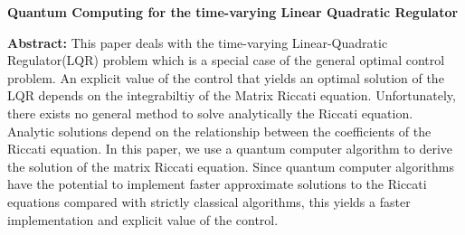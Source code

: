 \documentclass[12pt]{article}
\title{}
\begin{document}
\begin{center}
\textbf{{\huge  Quantum Computing for the time-varying   Linear Quadratic Regulator }}
    \begin{center} 
\bigskip
\bigskip
    {\large } 
\end{center}
\begin{center}
\end{center}
\end{center}
\begin{center} 
\end{center}
\begin{center} 
\bigskip

\end{center}

    \begin{center}                                                  {\large} 
\end{center}

{\Large \bf Abstract:}
This paper deals with the time-varying Linear-Quadratic Regulator(LQR) problem which is a special case of the general optimal control problem. An explicit value of the control that yields  an optimal solution  of the LQR depends on the integrabiltiy of the Matrix Riccati equation. Unfortunately, there exists no general method to solve analytically the Riccati equation. Analytic solutions  depend on the relationship between the coefficients of the Riccati equation.
In this paper, we use a quantum computer algorithm to derive the solution of the matrix Riccati equation. Since quantum computer algorithms have the potential to implement faster
approximate solutions to the Riccati equations compared with strictly classical
algorithms, this yields a faster implementation and explicit value of the control.
\end{document}
